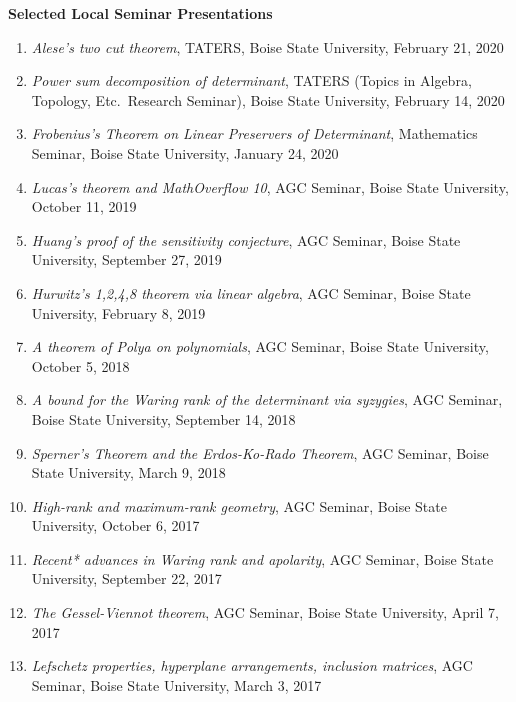 \documentclass[12pt]{article}
\begin{document}
\textbf{Selected Local Seminar Presentations}
\begin{enumerate}[revarabic,labelwidth=*]
\item \textit{Alese's two cut theorem},
TATERS, Boise State University, February 21, 2020
\item \textit{Power sum decomposition of determinant},
TATERS (Topics in Algebra, Topology, Etc.\ Research Seminar), Boise State University, February 14, 2020
\item \textit{Frobenius's Theorem on Linear Preservers of Determinant},
Mathematics Seminar, Boise State University, January 24, 2020
\item \textit{Lucas’s theorem and MathOverflow 10},
AGC Seminar, Boise State University, October 11, 2019
\item \textit{Huang's proof of the sensitivity conjecture},
AGC Seminar, Boise State University, September 27, 2019
\item \textit{Hurwitz’s 1,2,4,8 theorem via linear algebra},
AGC Seminar, Boise State University, February 8, 2019
\item \textit{A theorem of Polya on polynomials},
AGC Seminar, Boise State University, October 5, 2018
\item \textit{A bound for the Waring rank of the determinant via syzygies},
AGC Seminar, Boise State University, September 14, 2018
\item \textit{Sperner’s Theorem and the Erdos-Ko-Rado Theorem},
AGC Seminar, Boise State University, March 9, 2018
\item \textit{High-rank and maximum-rank geometry},
AGC Seminar, Boise State University, October 6, 2017
\item \textit{Recent* advances in Waring rank and apolarity},
AGC Seminar, Boise State University, September 22, 2017
\item \textit{The Gessel-Viennot theorem},
AGC Seminar, Boise State University, April 7, 2017
\item \textit{Lefschetz properties, hyperplane arrangements, inclusion matrices},
AGC Seminar, Boise State University, March 3, 2017

\end{enumerate}
\end{document}
